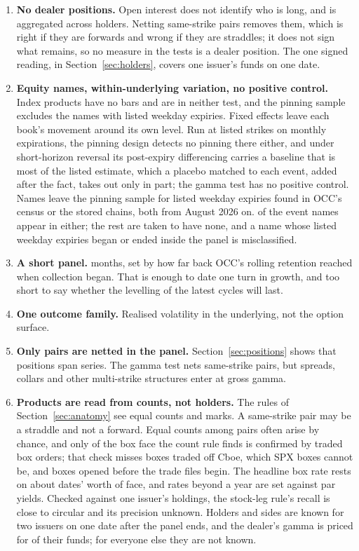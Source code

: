 \documentclass[11pt]{article}
\begin{document}
\begin{enumerate}
\item \textbf{No dealer positions.} Open interest does not identify who is long, and
is aggregated across holders. Netting same-strike pairs removes them, which is right if
they are forwards and wrong if they are straddles; it does not
sign what remains, so no measure in the tests is a dealer position. The one signed
reading, in Section~\ref{sec:holders}, covers one issuer's funds on one date.
\item \textbf{Equity names, within-underlying variation, no positive control.} Index
products have no bars and are in neither test, and the pinning sample excludes the names
with listed weekday expiries. Fixed effects leave each book's movement around its own
level. Run at listed strikes on monthly expirations, the pinning design detects no pinning
there either, and under short-horizon reversal its post-expiry differencing carries a
baseline that is most of the listed estimate, which a placebo matched to each event,
added after the fact, takes out only in part;
the gamma test has no positive control. Names leave the pinning sample for listed
weekday expiries found in OCC's census or the stored chains, both from August 2026 on.
\PinInListed{} of the \PinUnderlyings{} event names appear in either; the rest are taken to
have none, and a name whose listed weekday expiries began or ended inside the panel is
misclassified.
\item \textbf{A short panel.} \PanelMonths{} months, set by how far back OCC's rolling
retention reached when collection began. That is enough to date one turn in growth, and
too short to say whether the levelling of the latest cycles will last.
\item \textbf{One outcome family.} Realised volatility in the underlying, not the option
surface.
\item \textbf{Only pairs are netted in the panel.} Section~\ref{sec:positions} shows
that positions span series. The gamma test nets same-strike pairs, but spreads, collars
and other multi-strike structures enter at gross gamma.
\item \textbf{Products are read from counts, not holders.} The rules of
Section~\ref{sec:anatomy} see equal counts and marks. A same-strike pair may be a
straddle and not a forward. Equal counts among pairs often arise by chance, and only
\BoxRTradedShare{} of the box face the count rule finds is confirmed by traded box orders;
that check misses boxes traded off Cboe, which SPX boxes cannot be, and boxes opened
before the trade files begin. The headline box rate rests on about \BoxREffectiveDates{}
dates' worth of face, and rates beyond a year are set against par yields. Checked
against one issuer's holdings, the stock-leg rule's recall is close to circular and its
precision unknown. Holders and sides are known for two issuers on one date after the
panel ends, and the dealer's gamma is priced for \HoldCoverageFunds{} of their
\HoldFlexFunds{} funds; for everyone else they are not known.
\end{enumerate}
\end{document}
